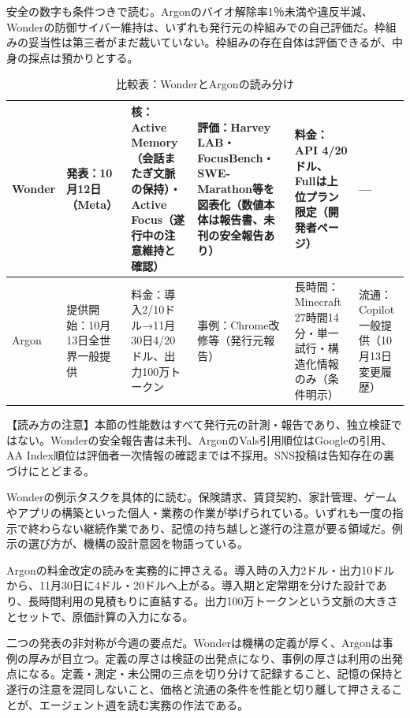 \documentclass[lualatex,a4paper,10pt]{jlreq}
\begin{document}
安全の数字も条件つきで読む。Argonのバイオ解除率1％未満や違反半減、Wonderの防御サイバー維持は、いずれも発行元の枠組みでの自己評価だ。枠組みの妥当性は第三者がまだ裁いていない。枠組みの存在自体は評価できるが、中身の採点は預かりとする。

\begin{table}[htbp]\centering\footnotesize
\caption{比較表：WonderとArgonの読み分け}
\begin{tabularx}{0.96\linewidth}{@{}lXXXXX@{}}
\toprule
Wonder & 発表：10月12日（Meta） & 核：Active Memory（会話またぎ文脈の保持）・Active Focus（遂行中の注意維持と確認） & 評価：Harvey LAB・FocusBench・SWE-Marathon等を図表化（数値本体は報告書、未刊の安全報告あり） & 料金：API 4/20ドル、Fullは上位プラン限定（開発者ページ） & --- \\
\midrule
Argon & 提供開始：10月13日全世界一般提供 & 料金：導入2/10ドル→11月30日4/20ドル、出力100万トークン & 事例：Chrome改修等（発行元報告） & 長時間：Minecraft 27時間14分・単一試行・構造化情報のみ（条件明示） & 流通：Copilot一般提供（10月13日変更履歴） \\
\bottomrule
\end{tabularx}
\end{table}
\begin{tcolorbox}[colback=SurveySoft,colframe=SurveyRule,arc=1mm,boxrule=0.4pt,left=2mm,right=2mm]
【読み方の注意】本節の性能数はすべて発行元の計測・報告であり、独立検証ではない。Wonderの安全報告書は未刊、ArgonのVals引用順位はGoogleの引用、AA Index順位は評価者一次情報の確認までは不採用。SNS投稿は告知存在の裏づけにとどまる。
\end{tcolorbox}
Wonderの例示タスクを具体的に読む。保険請求、賃貸契約、家計管理、ゲームやアプリの構築といった個人・業務の作業が挙げられている。いずれも一度の指示で終わらない継続作業であり、記憶の持ち越しと遂行の注意が要る領域だ。例示の選び方が、機構の設計意図を物語っている。

Argonの料金改定の読みを実務的に押さえる。導入時の入力2ドル・出力10ドルから、11月30日に4ドル・20ドルへ上がる。導入期と定常期を分けた設計であり、長時間利用の見積もりに直結する。出力100万トークンという文脈の大きさとセットで、原価計算の入力になる。

二つの発表の非対称が今週の要点だ。Wonderは機構の定義が厚く、Argonは事例の厚みが目立つ。定義の厚さは検証の出発点になり、事例の厚さは利用の出発点になる。定義・測定・未公開の三点を切り分けて記録すること、記憶の保持と遂行の注意を混同しないこと、価格と流通の条件を性能と切り離して押さえることが、エージェント週を読む実務の作法である。
\end{document}
